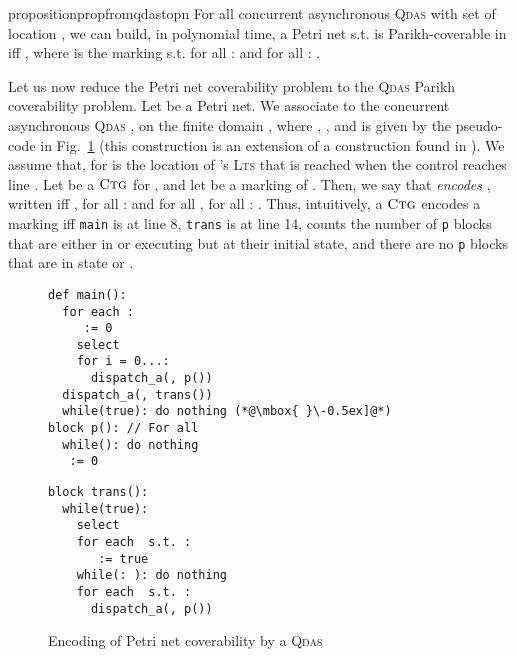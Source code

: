 \documentclass[runningheads,oribibl,]{article}
\newcommand{\lts}{\textsc{Lts}\xspace}
\newcommand{\qdas}{\textsc{Qdas}\xspace}
\newcommand{\ctg}{\ensuremath{\textsc{Ctg}}\xspace}
\begin{document}
\begin{restatable}{proposition}{propfromqdastopn}
  \label{prop:from-qdas-to-pn}
  For all concurrent asynchronous \qdas  with set of location
  , we can build, in polynomial time, a Petri net  s.t.  is
  Parikh-coverable in  iff , where  is the
  marking s.t. for all :  and for all : .
\end{restatable}

Let us now reduce the Petri net coverability problem to the \qdas
Parikh coverability problem. Let  be a Petri net. We
associate to  the concurrent asynchronous \qdas
, on the finite domain
, where , ,
 and  is given
by the pseudo-code in Fig.~\ref{fig:simulossyPN} (this construction is
an extension of a construction found in \cite{ganty-p-2010--a}).  We
assume that, for 
 is the location of 's \lts that is
reached when the control reaches line . Let  be a \ctg for , and let  be a
marking of . Then, we say that \emph{ encodes }, written
 iff 
,
 for all :  and  for all
, for all :
. Thus, intuitively, a \ctg  encodes a marking 
iff \texttt{main} is at line 8, \texttt{trans} is at line 14, 
counts the number of \texttt{p} blocks that are either in  or
executing but at their initial state, and there are no \texttt{p}
blocks that are in state  or .

\begin{figure}[!t]
  \centering
  \begin{minipage}[t]{.45\linewidth}
    \begin{lstlisting}[numberblanklines=false]
def main():
  for each :
     := 0
    select 
    for i = 0...:
      dispatch_a(, p())
  dispatch_a(, trans())
  while(true): do nothing (*@\mbox{ }\-0.5ex]@*)
block p(): // For all 
  while(): do nothing
   := 0
\end{lstlisting}
\end{minipage}
\begin{minipage}[t]{.45\linewidth}
  \begin{lstlisting}[firstnumber=last]
block trans():
  while(true):
    select 
    for each  s.t. :
       := true
    while(: ): do nothing
    for each  s.t. :
      dispatch_a(, p())
    \end{lstlisting}
  \end{minipage}
\caption{Encoding of Petri net coverability  by a \qdas}
  \label{fig:simulossyPN}
\end{figure}
\end{document}
